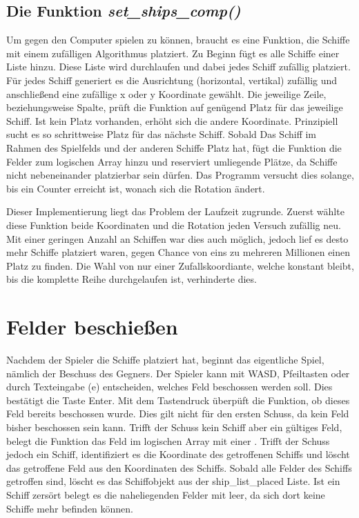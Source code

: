 \documentclass{llncs}
\begin{document}
\subsection{Die Funktion \emph{set\_ships\_comp()}}

Um gegen den Computer spielen zu können, braucht es eine Funktion, die Schiffe mit einem zufälligen Algorithmus platziert. Zu Beginn fügt es alle Schiffe einer Liste hinzu.
Diese Liste wird durchlaufen und dabei jedes Schiff zufällig platziert. Für jedes Schiff generiert es die Ausrichtung (horizontal, vertikal) zufällig und anschließend eine 
zufällige x oder y Koordinate gewählt. Die jeweilige Zeile, beziehungsweise Spalte, prüft die Funktion auf genügend Platz für das jeweilige Schiff.
Ist kein Platz vorhanden, erhöht sich die andere Koordinate. Prinzipiell sucht es so schrittweise Platz für das nächste Schiff. Sobald Das Schiff im Rahmen des Spielfelds
und der anderen Schiffe Platz hat, fügt die Funktion die Felder zum logischen Array hinzu und reserviert umliegende Plätze, da Schiffe nicht nebeneinander platzierbar sein dürfen.
Das Programm versucht dies solange, bis ein Counter erreicht ist, wonach sich die Rotation ändert.

Dieser Implementierung liegt das Problem der Laufzeit zugrunde. Zuerst wählte diese Funktion beide Koordinaten und die Rotation jeden Versuch zufällig neu. Mit einer geringen Anzahl
an Schiffen war dies auch möglich, jedoch lief es desto mehr Schiffe platziert waren, gegen Chance von eins zu mehreren Millionen einen Platz zu finden. Die Wahl von nur einer Zufallskoordiante, welche konstant bleibt,
bis die komplette Reihe durchgelaufen ist, verhinderte dies. 

\section{Felder beschießen}

Nachdem der Spieler die Schiffe platziert hat, beginnt das eigentliche Spiel, nämlich der Beschuss des Gegners. Der Spieler kann mit WASD, Pfeiltasten oder durch Texteingabe (e) entscheiden,
welches Feld beschossen werden soll. Dies bestätigt die Taste \glqq Enter\grqq{}. Mit dem Tastendruck überpüft die Funktion, ob dieses Feld bereits beschossen wurde.
Dies gilt nicht für den ersten Schuss, da kein Feld bisher beschossen sein kann. Trifft der Schuss kein Schiff aber ein gültiges Feld, belegt die Funktion das Feld im logischen Array mit einer \grqq{}.
Trifft der Schuss jedoch ein Schiff, identifiziert es die Koordinate des getroffenen Schiffs und löscht das getroffene Feld aus den Koordinaten des Schiffs.
Sobald alle Felder des Schiffs getroffen sind, löscht es das Schiffobjekt aus der ship\_list\_placed Liste. Ist ein Schiff zersört belegt es die naheliegenden Felder mit leer,
da sich dort keine Schiffe mehr befinden können.
\end{document}
